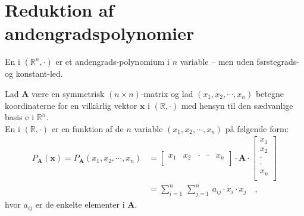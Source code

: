 

\section{Reduktion af andengradspolynomier}

En  i $(\mathbb{R}^{n}, \bm{\cdot})$ er et andengrads-polynomium
i $n$ variable -- men uden førstegrads- og konstant-led.

\begin{definition}
Lad $\mathbf{A}$ være en symmetrisk $(n \times n)$-matrix og lad $(x_{1}, x_{2}, \cdots, x_{n})$ betegne koordinaterne for en  vilkårlig vektor $\mathbf{x}$ i $(\mathbb{R}, \bm{\cdot})$ med hensyn til den sædvanlige basis e i $\mathbb{R}^{n}$. \\

En  i $(\mathbb{R}, \bm{\cdot})$ er en funktion af de $n$ variable $(x_{1}, x_{2}, \cdots, x_{n})$ på følgende form:
\begin{equation}
\begin{aligned}
P_{\mathbf{A}}(\mathbf{x}) = P_{\mathbf{A}}(x_{1}, x_{2}, \cdots, x_{n}) &= \left[
                                                   \begin{array}{ccccc}
                                                     x_{1} & x_{2} & \cdot & \cdot & x_{n} \\
                                                   \end{array}
                                                 \right]
 \cdot \mathbf{A} \cdot \left[
                                                   \begin{array}{c}
                                                     x_{1} \\
                                                    x_{2} \\
                                                     \cdot \\
                                                     \cdot \\
                                                     x_{n} \\
                                                   \end{array}
                                                 \right] \\
&= \sum_{i=1}^{n}\,\sum_{j=1}^{n} \, a_{ij}\cdot x_{i}\cdot x_{j} \quad ,
\end{aligned}
\end{equation}
hvor $a_{ij}$ er de enkelte elementer i $\mathbf{A}$.
\end{definition}


